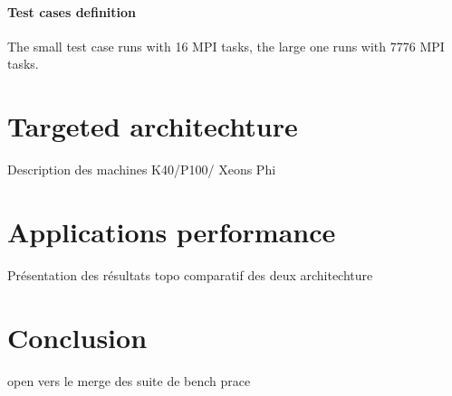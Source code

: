 \subsection{Test cases definition}
The small test case runs with 16 MPI tasks, the large one runs with 7776 MPI tasks.


\part{Targeted architechture}
Description des machines K40/P100/ Xeons Phi

\part{Applications performance}
Présentation des résultats
topo comparatif des deux architechture

\part*{Conclusion}
open vers le merge des suite de bench prace
